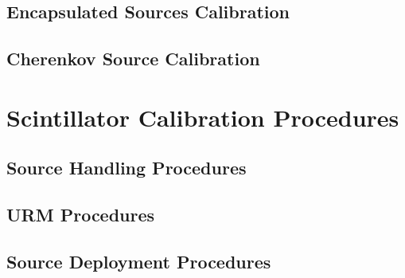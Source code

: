 \documentclass[10pt]{report}
\begin{document}
\chapter{Encapsulated Sources Calibration}

\chapter{Cherenkov Source Calibration}

\part{Scintillator Calibration Procedures}
\chapter{Source Handling Procedures}
%


\chapter{URM Procedures}



\chapter{Source Deployment Procedures}




\end{document}
